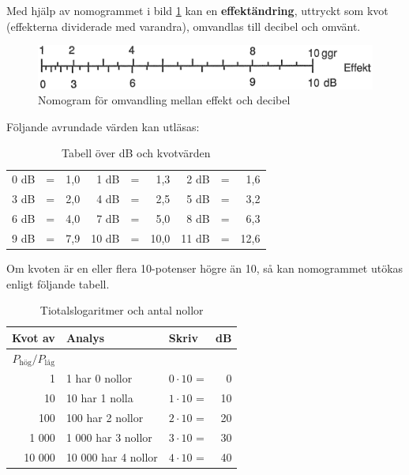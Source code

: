 Med hjälp av nomogrammet i bild \ref{ellära-nomogram-db-effekt} kan en
\textbf{effektändring}, uttryckt som kvot (effekterna dividerade med varandra),
omvandlas till decibel och omvänt.

\begin{figure}
  \includegraphics[width=\textwidth]{images/nomogram_db_effekt.png}  \caption{Nomogram för omvandling mellan effekt och decibel}
  \label{ellära-nomogram-db-effekt}
\end{figure}

Följande avrundade värden kan utläsas:

\begin{table}[h]
\begin{tabular}{rcr|rcr|rcr}
	0 dB & = & 1,0 &  1 dB & = &  1,3 &  2 dB & = &  1,6 \\
	3 dB & = & 2,0 &  4 dB & = &  2,5 &  5 dB & = &  3,2 \\
	6 dB & = & 4,0 &  7 dB & = &  5,0 &  8 dB & = &  6,3 \\
	9 dB & = & 7,9 & 10 dB & = & 10,0 & 11 dB & = & 12,6
\end{tabular}
\caption{Tabell över dB och kvotvärden}
\end{table}


Om kvoten är en eller flera 10-potenser högre än 10, så kan nomogrammet utökas
enligt följande tabell.

\begin{table}[h]
\begin{tabular}{rllr}
	                      Kvot av & Analys              & Skriv            & dB 
	                      \\ \hline
	\(P_\text{hög}/P_\text{låg}\) &                     &                  &  \\
	                            1 & 1 har 0 nollor      & \(0 \cdot 10\) = &  0 
	                            \\
	                           10 & 10 har 1 nolla      & \(1 \cdot 10\) = & 10 
	                           \\
	                          100 & 100 har 2 nollor    & \(2 \cdot 10\) = & 20 
	                          \\
	                        1 000 & 1 000 har 3 nollor  & \(3 \cdot 10\) = & 30 
	                        \\
	                       10 000 & 10 000 har 4 nollor & \(4 \cdot 10\) = & 40
\end{tabular}
\caption{Tiotalslogaritmer och antal nollor}
\end{table}


